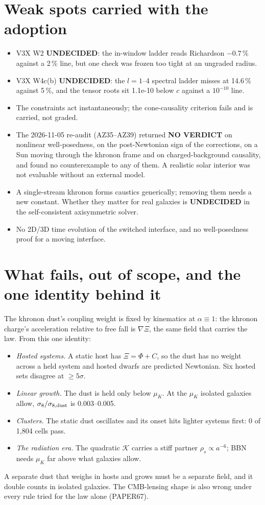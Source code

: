 \documentclass[10pt]{article}
\begin{document}
\section{Weak spots carried with the adoption}
\begin{itemize}
\item V3X W2 \textbf{UNDECIDED}: the in-window ladder reads Richardson $-0.7$\,\% against a 2\,\% line, but one check was frozen too tight at an ungraded radius.
\item V3X W4c(b) \textbf{UNDECIDED}: the $l=1$--4 spectral ladder misses at 14.6\,\% against 5\,\%, and the tensor roots sit 1.1e-10 below $c$ against a $10^{-10}$ line.
\item The constraints act instantaneously; the cone-causality criterion fails and is carried, not graded.
\item The 2026-11-05 re-audit (AZ35--AZ39) returned \textbf{NO VERDICT} on nonlinear well-posedness, on the post-Newtonian sign of the corrections, on a Sun moving through the khronon frame and on charged-background causality, and found no counterexample to any of them. A realistic solar interior was not evaluable without an external model.
\item A single-stream khronon forms caustics generically; removing them needs a new constant. Whether they matter for real galaxies is \textbf{UNDECIDED} in the self-consistent axisymmetric solver.
\item No 2D/3D time evolution of the switched interface, and no well-posedness proof for a moving interface.
\end{itemize}

\section{What fails, out of scope, and the one identity behind it}
The khronon dust's coupling weight is fixed by kinematics at $\alpha\equiv1$: the khronon charge's acceleration relative to free fall is $\nabla\Xi$, the same field that carries the law. From this one identity:
\begin{itemize}
\item \emph{Hosted systems.} A static host has $\Xi=\Phi+C$, so the dust has no weight across a held system and hosted dwarfs are predicted Newtonian. Six hosted sets disagree at $\ge5\sigma$.
\item \emph{Linear growth.} The dust is held only below $\mu_K$. At the $\mu_K$ isolated galaxies allow, $\sigma_8/\sigma_{8,\rm dust}$ is 0.003--0.005.
\item \emph{Clusters.} The static dust oscillates and its onset hits lighter systems first: 0 of 1,804 cells pass.
\item \emph{The radiation era.} The quadratic $\mathcal K$ carries a stiff partner $\rho_s\propto a^{-6}$; BBN needs $\mu_K$ far above what galaxies allow.
\end{itemize}
A separate dust that weighs in hosts and grows must be a separate field, and it double counts in isolated galaxies. The CMB-lensing shape is also wrong under every rule tried for the law alone (PAPER67).
\end{document}
